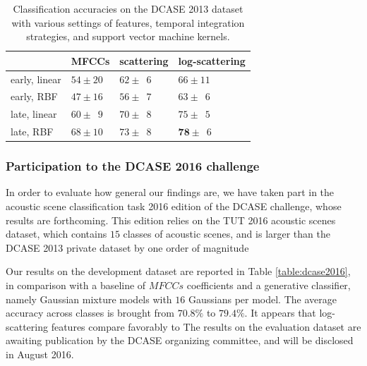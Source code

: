 \documentclass[journal]{IEEEtran}
\begin{document}
\begin{table}
\begin{center}
\begin{tabular}{llll}
             & MFCCs         & scattering & log-scattering  \\
             \hline
early, linear  & $54\pm20$   & $62\pm\phantom{0}6$  & $66\pm11$     \\
early, RBF     & $47\pm16$  & $56\pm\phantom{0}7$  & $63\pm\phantom{0}6$   \\
late, linear  & $60\pm\phantom{0}9$ & $70\pm\phantom{0}8$  & $75\pm\phantom{0}5$   \\
late, RBF     & $68\pm10$ & $73\pm\phantom{0}8$  & $\mathbf{78}\pm\phantom{0}6$   \\
\end{tabular}
\caption{Classification accuracies on the DCASE 2013 dataset with various settings of features, temporal integration strategies, and support vector machine kernels.}
\end{center}
\label{table:dcase2013}
\end{table}

\subsubsection*{Participation to the DCASE 2016 challenge}
In order to evaluate how general our findings are, we have taken part in the acoustic scene classification task 2016 edition of the DCASE challenge, whose results are forthcoming.
This edition relies on the TUT 2016 acoustic scenes dataset, which contains $15$ classes of acoustic scenes, and is larger than the DCASE 2013 private dataset by one order of magnitude

Our results on the development dataset are reported in Table \ref{table:dcase2016}, in comparison with a baseline of $MFCCs$ coefficients and a generative classifier, namely Gaussian mixture models with $16$ Gaussians per model.
The average accuracy across classes is brought from $70.8\%$ to $79.4\%$.
It appears that log-scattering features compare favorably to 
The results on the evaluation dataset are awaiting publication by the DCASE organizing committee, and will be disclosed in August 2016.
\end{document}

